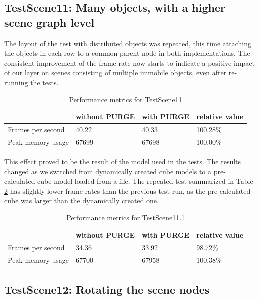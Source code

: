 	\subsection{TestScene11: Many objects, with a higher scene graph level}

		The layout of the test with distributed objects was repeated, this time attaching the objects in each row to a common parent node in both implementations. The consistent improvement of the frame rate now starts to indicate a positive impact of our layer on scenes consisting of multiple immobile objects, even after re-running the tests.

		\begin{table}[htpb]
			\center
			\caption{Performance metrics for TestScene11}
			\begin{tabular}{l | l | l | l}
				& without PURGE & with PURGE & relative value\\ \hline
				Frames per second & 40.22 & 40.33 & 100.28\%\\
				Peak memory usage & 67699 & 67698 & 100.00\%\\
			\end{tabular}
			\label{tbl:Performance11}
		\end{table}

		This effect proved to be the result of the model used in the tests. The results changed as we switched from dynamically created cube models to a pre-calculated cube model loaded from a file. The repeated test summarized in Table \ref{tbl:Performance11.1} has slightly lower frame rates than the previous test run, as the pre-calculated cube was larger than the dynamically created one.

		\begin{table}[htpb]
			\center
			\caption{Performance metrics for TestScene11.1}
			\begin{tabular}{l | l | l | l}
				& without PURGE & with PURGE & relative value\\ \hline
				Frames per second & 34.36 & 33.92 & 98.72\%\\
				Peak memory usage & 67700 & 67958 & 100.38\%\\
			\end{tabular}
			\label{tbl:Performance11.1}
		\end{table}

	\subsection{TestScene12: Rotating the scene nodes}

